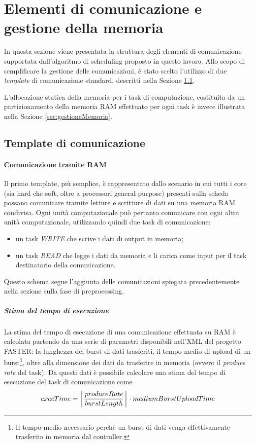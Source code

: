 
\section{Elementi di comunicazione e gestione della memoria}
\label{sec:elementiComunicazioneGestioneMemoria}
In questa sezione viene presentata la struttura degli elementi di comunicazione 
supportata dall'algoritmo di scheduling proposto in questo lavoro.
Allo scopo di semplificare la gestione delle comunicazioni, è stato scelto 
l'utilizzo di due \emph{template} di comunicazione standard, descritti nella 
Sezione \ref{sec:templateComunicazione}.

L'allocazione statica della memoria per i task di computazione, costituita da 
un partizionamento della memoria \acs{RAM} effettuato per ogni task è invece 
illustrata nella Sezione \ref{sec:gestioneMemoria}.


\subsection{Template di comunicazione}
\label{sec:templateComunicazione}

\paragraph{Comunicazione tramite \acs{RAM}}
Il primo template, più semplice, è rappresentato dallo scenario in cui tutti i 
core (sia hard che soft, oltre a processori general purpose) presenti sulla 
scheda possano comunicare tramite letture e scritture di dati su una memoria 
\acs{RAM} condivisa. Ogni unità computazionale può pertanto comunicare con ogni 
altra unità computazionale, utilizzando quindi due task di comunicazione:
\begin{itemize}
 \item un task \emph{WRITE} che scrive i dati di output in memoria;
 \item un task \emph{READ} che legge i dati da memoria e li carica come input 
per il task destinatario della comunicazione.
\end{itemize}
Questo schema segue l'aggiunta delle comunicazioni spiegata precedentemente 
nella sezione sulla fase di preprocessing.

\subparagraph{Stima del tempo di esecuzione}
La stima del tempo di esecuzione di una comunicazione effettuata su \acs{RAM} è 
calcolata partendo da una serie di parametri disponibili nell'XML del progetto 
\ac{FASTER}: la lunghezza del burst di dati trasferiti, il tempo medio di upload 
di un burst\footnote{Il tempo medio necessario perchè un burst di dati venga 
effettivamente trasferito in memoria dal controller.}, oltre alla dimensione 
dei dati da trasferire in memoria (ovvero il \emph{produce rate} del task). Da 
questi dati è possibile calcolare una stima del tempo di esecuzione del task di 
comunicazione come
\begin{equation}
execTime = \ceil[\bigg]{\frac{produceRate}{burstLength}} \cdot 
mediumBurstUploadTime
\end{equation}




